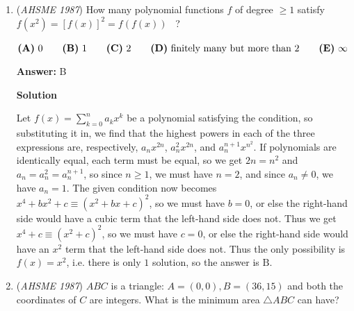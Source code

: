 \begin{enumerate}
 \textbf{Answer: }D



\textbf{Solution}

For integer roots, we need the discriminant, which is $p^2 - 4 \cdot 1 \cdot (-444p) = p^2 + 1776p = p(p+1776)$, to be a perfect square. Now, this means that $p$ must divide $p + 1776$, as if it did not, there would be a lone prime factor of $p$, and so this expression could not possibly be a perfect square. Thus $p$ divides $p + 1776$, which implies $p$ divides $1776 = 2^{4} \cdot 3 \cdot 37$, so we must have $p = 2$, $3$, or $37$. It is easy to verify that neither $p = 2$ nor $p = 3$ make $p(p+1776)$ a perfect square, but $p = 37$ does, so the answer is $31 < p \le 41$, which is $\boxed{\text{D}}$.

 


	\item (\textit{AHSME 1987}) How many polynomial functions $f$ of degree $\ge 1$ satisfy
$f(x^2)=[f(x)]^2=f(f(x))$  ?


 $\textbf{(A)}\ 0 \qquad \textbf{(B)}\ 1 \qquad \textbf{(C)}\ 2 \qquad \textbf{(D)}\ \text{finitely many but more than 2}\\ \qquad \textbf{(E)}\ \infty$

 \textbf{Answer: }B



\textbf{Solution}

Let $f(x) = \sum_{k=0}^{n} a_{k} x^{k}$ be a polynomial satisfying the condition, so substituting it in, we find that the highest powers in each of the three expressions are, respectively, $a_{n}x^{2n}$, $a_{n}^{2}x^{2n}$, and $a_{n}^{n+1}x^{n^{2}}$. If polynomials are identically equal, each term must be equal, so we get $2n = n^2$ and $a_{n} = a_{n}^{2} = a_{n}^{n+1}$, so since $n \geq 1$, we must have $n = 2$, and since $a_{n} \neq 0$, we have $a_{n} = 1$. The given condition now becomes $x^4 + bx^2 + c \equiv (x^2 + bx + c)^2$, so we must have $b = 0$, or else the right-hand side would have a cubic term that the left-hand side does not. Thus we get $x^4 + c \equiv (x^2 + c)^2$, so we must have $c = 0$, or else the right-hand side would have an $x^2$ term that the left-hand side does not. Thus the only possibility is $f(x) = x^2$, i.e. there is only $1$ solution, so the answer is $\boxed{\text{B}}$.

 


	\item (\textit{AHSME 1987}) $ABC$ is a triangle: $A=(0,0), B=(36,15)$ and both the coordinates of $C$ are integers. What is the minimum area $\triangle ABC$ can have?



\end{enumerate}
